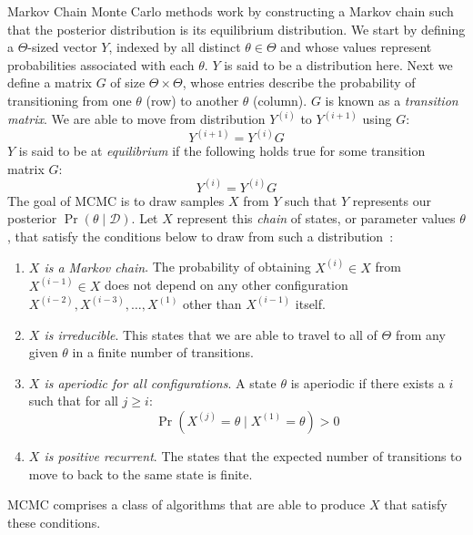 Markov Chain Monte Carlo methods work by constructing a Markov chain such that the posterior distribution is its
equilibrium distribution.
We start by defining a $\Theta$-sized vector $Y$, indexed by all distinct $\theta \in \Theta$ and whose values represent
probabilities associated with each $\theta$.
$Y$ is said to be a distribution here.
Next we define a matrix $G$ of size $\Theta \times \Theta$, whose entries describe the probability of transitioning
from one $\theta$ (row) to another $\theta$ (column).
$G$ is known as a \emph{transition matrix}.
We are able to move from distribution $Y^{(i)}$ to $Y^{(i + 1)}$ using $G$:
\begin{equation}
    Y^{(i + 1)} = Y^{(i)} G
\end{equation}
$Y$ is said to be at \emph{equilibrium} if the following holds true for some transition matrix $G$:
\begin{equation}
    Y^{(i)} = Y^{(i)} G
\end{equation}
The goal of MCMC is to draw samples $X$ from $Y$ such that $Y$ represents our posterior $\Pr (\theta \mid \mathcal{D})$.
Let $X$ represent this \emph{chain} of states, or parameter values $\theta$, that satisfy the
conditions below to draw from such a distribution~\cite{hanadaMarkovChainMonte2018}:
\begin{enumerate}
    \item \emph{$X$ is a Markov chain}.
        The probability of obtaining $X^{(i)} \in X$ from $X^{(i - 1)} \in X$ does not depend on any other configuration
        $X^{(i - 2)}, X^{(i - 3)}, \ldots, X^{(1)}$ other than $X^{(i - 1)}$ itself.
    \item \emph{$X$ is irreducible}.
        This states that we are able to travel to all of $\Theta$ from any given $\theta$ in a finite number of
        transitions.
    \item \emph{$X$ is aperiodic for all configurations}.
        A state $\theta$ is aperiodic if there exists a $i$ such that for all $j \geq i$:
        \begin{equation}
            \Pr \left( X^{(j)} = \theta \mid X^{(1)} = \theta \right) > 0
        \end{equation}
    \item \emph{$X$ is positive recurrent}.
        The states that the expected number of transitions to move to back to the same state is finite.
\end{enumerate}
MCMC comprises a class of algorithms that are able to produce $X$ that satisfy these conditions.

